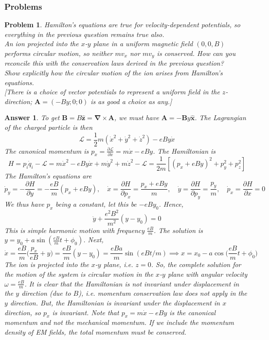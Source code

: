 \documentclass[a4paper]{article}
\newtheorem{ans}{Answer}[section]
\theoremstyle{new}
\newtheorem{qns}{Problem}[section]
\begin{document}
\subsubsection{Problems}
\begin{qns}
Hamilton’s equations are true for velocity-dependent potentials, so everything in the previous question remains true also.\\[5pt]
An ion projected into the $x$-$y$ plane in a uniform magnetic field $(0, 0,B)$ performs circular motion, so neither $mv_x$ nor $mv_y$ is conserved. How can you reconcile this with the conservation laws derived in the previous question?\\[5pt]
Show explicitly how the circular motion of the ion arises from Hamilton’s equations.\\[5pt]
[There is a choice of vector potentials to represent a uniform field in the $z$-direction; $\mathbf{A} =(-By; 0; 0)$ is as good a choice as any.]
\end{qns}
\begin{ans}
To get $\mathbf{B}=B\mathbf{\hat{z}}=\boldsymbol{\nabla}\times\mathbf{A}$, we must have $\mathbf{A}=-\mathbf{B}y\mathbf{\hat{x}}$. The Lagrangian of the charged particle is then
$$\mathcal{L}=\frac{1}{2}m(\dot{x}^2+\dot{y}^2+\dot{z}^2)-eBy\dot{x}$$
The canonical momentum is $p_x=\frac{\partial\mathcal{L}}{\partial\dot{x}}=m\dot{x}-eBy$. The Hamiltonian is 
$$H=p_i\dot{q}_i-\mathcal{L}=m\dot{x}^2-eBy\dot{x}+m\dot{y}^2+m\dot{z}^2-\mathcal{L}=\frac{1}{2m}[(p_x+eBy)^2+p_y^2+p_z^2]$$
The Hamilton's equations are
$$\dot{p}_y=-\frac{\partial H}{\partial y}=-\frac{eB}{m}(p_x+eBy),\quad\dot{x}=\frac{\partial H}{\partial p_x}=\frac{p_x+eBy}{m},\quad\dot{y}=\frac{\partial H}{\partial p_y}=\frac{p_y}{m},\quad\dot{p}_x=\frac{\partial H}{\partial x}=0$$
We thus have $p_x$ being a constant, let this be $-eBy_0$. Hence,
$$\ddot{y}+\frac{e^2B^2}{m^2}(y-y_0)=0$$
This is simple harmonic motion with frequency $\frac{eB}{m}$. The solution is $y=y_0+a\sin(\frac{eB}{m}t+\phi_0)$. Next, 
$$\dot{x}=\frac{eB}{m}\bigg(\frac{p_x}{eB}+y\bigg)=\frac{eB}{m}(y-y_0)=\frac{eBa}{m}\sin(eBt/m)\implies x=x_0-a\cos\bigg(\frac{eB}{m}t+\phi_0\bigg)$$
The ion is projected into the $x$-$y$ plane, i.e. $z=0$. So, the complete solution for the motion of the system is circular motion in the $x$-$y$ plane with angular velocity $\omega=\frac{eB}{m}$. It is clear that the Hamiltonian is not invariant under displacement in the $y$ direction (due to $B$), i.e. momentum conservation law does not apply in the $y$ direction. But, the Hamiltonian is invariant under the displacement in $x$ direction, so $p_x$ is invariant. Note that $p_x=m\dot{x}-eBy$ is the canonical momentum and not the mechanical momentum. If we include the momentum density of EM fields, the total momentum must be conserved.
\end{ans}
\end{document}
